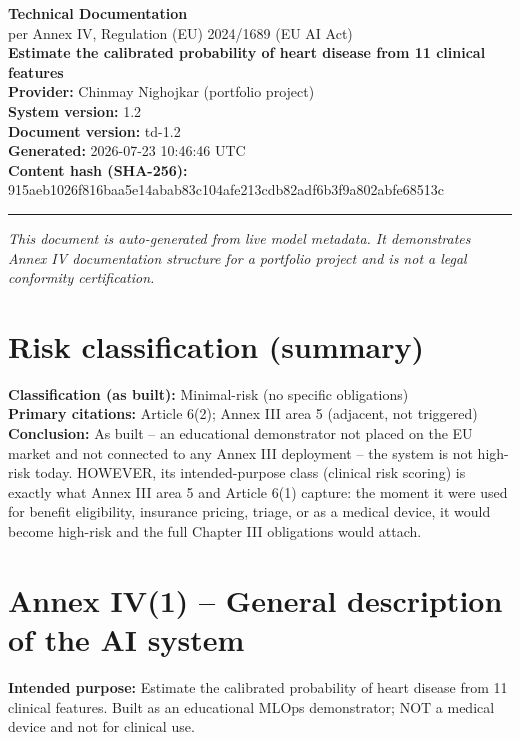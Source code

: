 \documentclass[11pt,a4paper]{article}
\begin{document}
\begin{center}
{\Huge\bfseries\color{acblue} Technical Documentation}\\[4pt]
{\large per Annex IV, Regulation (EU) 2024/1689 (EU AI Act)}\\[10pt]
{\large\bfseries Estimate the calibrated probability of heart disease from 11 clinical features}\\[6pt]
\textbf{Provider:} Chinmay Nighojkar (portfolio project)\\

\textbf{System version:} 1.2\\

\textbf{Document version:} td-1.2\\

\textbf{Generated:} 2026-07-23 10:46:46 UTC\\

\textbf{Content hash (SHA-256):} 915aeb1026f816baa5e14abab83c104afe213cdb82adf6b3f9a802abfe68513c\\

\end{center}
\vspace{4pt}\hrule\vspace{6pt}
\textit{\small This document is auto-generated from live model metadata. It demonstrates Annex IV documentation structure for a portfolio project and is not a legal conformity certification.}
\section*{Risk classification (summary)}
\textbf{Classification (as built):} Minimal-risk (no specific obligations)\\

\textbf{Primary citations:} Article 6(2); Annex III area 5 (adjacent, not triggered)\\

\textbf{Conclusion:} As built -- an educational demonstrator not placed on the EU market and not connected to any Annex III deployment -- the system is not high-risk today. HOWEVER, its intended-purpose class (clinical risk scoring) is exactly what Annex III area 5 and Article 6(1) capture: the moment it were used for benefit eligibility, insurance pricing, triage, or as a medical device, it would become high-risk and the full Chapter III obligations would attach.\\
\section*{Annex IV(1) -- General description of the AI system}
\textbf{Intended purpose:} Estimate the calibrated probability of heart disease from 11 clinical features. Built as an educational MLOps demonstrator; NOT a medical device and not for clinical use.\\
\end{document}
